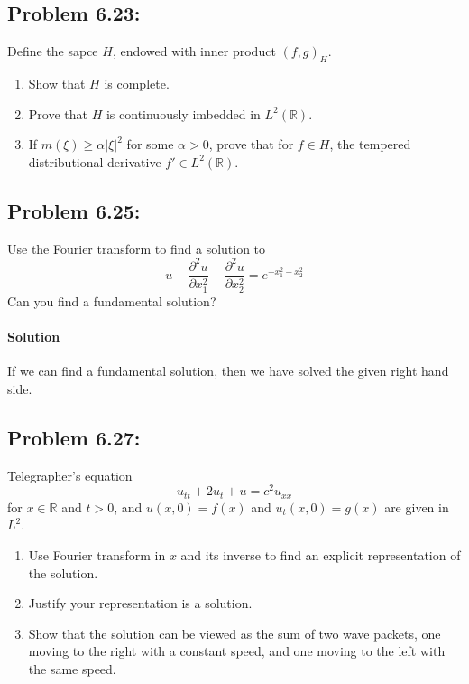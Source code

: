 \documentclass[letterpaper,twoside,11pt]{article}
\theoremstyle{mystyle}
\newcommand{\R}{{\mathbb R}}
\begin{document}
\subsection*{Problem 6.23:}
Define the sapce $H$, endowed with inner product $\left( f,g \right)_H$. 
\begin{enumerate}
  \item Show that $H$ is complete. 
  \item Prove that $H$ is continuously imbedded in $L^2 \left( \R \right)$. 
  \item If $m(\xi) \geq \alpha |\xi|^2$ for some $\alpha >0$, prove that for $f \in H$, the tempered distributional derivative $f'\in L^2(\R)$. 
\end{enumerate}


\subsection*{Problem 6.25:} 
Use the Fourier transform to find a solution to 
\[u - \frac{\partial^2 u }{\partial x_1^2 } - \frac{\partial^2 u }{\partial x_2^2 } = e^{-x_1^2 - x_2^2 } \] 
Can you find a fundamental solution? 

\paragraph*{Solution} If we can find a fundamental solution, then we have solved the given right hand side.


\subsection*{Problem 6.27:}
Telegrapher's equation 
\[u_{tt} + 2u_t + u = c^2 u_{xx} \]
for $x \in \R$ and $t>0$, and $u(x, 0) = f(x)$ and $u_t(x, 0) = g(x)$ are given in $L^2$. 
\begin{enumerate}
  \item Use Fourier transform in $x$ and its inverse to find an explicit representation of the solution. 
  \item Justify your representation is a solution. 
  \item Show that the solution can be viewed as the sum of two wave packets, one moving to the right with a constant speed, and one moving to the left with the same speed. 
\end{enumerate}
\end{document}

